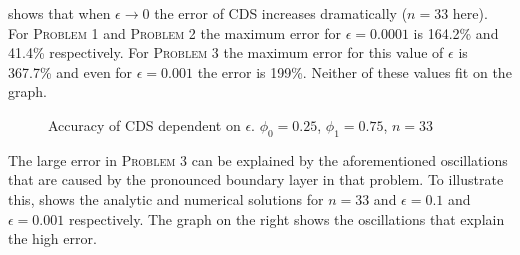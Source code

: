 \documentclass[../00_main.tex]{subfiles}
\begin{document}
 shows that when $\epsilon \rightarrow 0$ the error
of CDS increases dramatically ($n=33$ here). For \textsc{Problem 1} and 
\textsc{Problem 2} the maximum error for $\epsilon=0.0001$ is 164.2\% and
41.4\% respectively. For \textsc{Problem 3} the maximum error for this value
of $\epsilon$ is 367.7\% and even for $\epsilon=0.001$ the error is 199\%.
Neither of these values fit on the graph.\\
\begin{figure}[h]
\centering{}
    \vspace{-20pt}
    \caption{Accuracy of CDS dependent on $\epsilon$.
    $\phi_0=0.25$, $\phi_1=0.75$, $n=33$}
\label{fig:err_cds_eps}
\end{figure}
The large error in \textsc{Problem 3} can be explained by the aforementioned
oscillations that are caused by the pronounced boundary layer in that problem. 
To illustrate this,  shows the analytic and numerical 
solutions for $n=33$ and $\epsilon=0.1$ and $\epsilon=0.001$ respectively. The 
graph on the right shows the oscillations that explain the high error.
\end{document}
